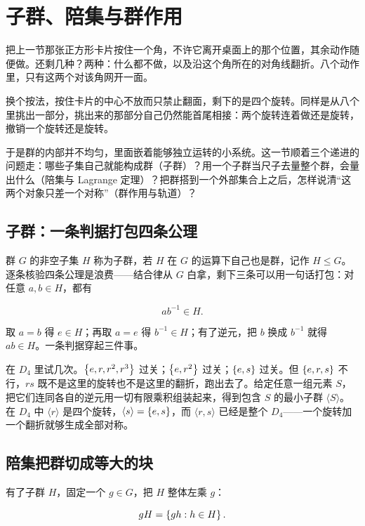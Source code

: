 \section{子群、陪集与群作用}
\label{sec:04-Discrete-Mathematics/06-Groups-and-Symmetry/02}

把上一节那张正方形卡片按住一个角，不许它离开桌面上的那个位置，其余动作随便做。还剩几种？两种：什么都不做，以及沿这个角所在的对角线翻折。八个动作里，只有这两个对该角网开一面。

换个按法，按住卡片的中心不放而只禁止翻面，剩下的是四个旋转。同样是从八个里挑出一部分，挑出来的那部分自己仍然能首尾相接：两个旋转连着做还是旋转，撤销一个旋转还是旋转。

于是群的内部并不均匀，里面嵌着能够独立运转的小系统。这一节顺着三个递进的问题走：哪些子集自己就能构成群（子群）？用一个子群当尺子去量整个群，会量出什么（陪集与 Lagrange 定理）？把群搭到一个外部集合上之后，怎样说清``这两个对象只差一个对称''（群作用与轨道）？

\subsection{子群：一条判据打包四条公理}

群 \(G\) 的非空子集 \(H\) 称为子群，若 \(H\) 在 \(G\) 的运算下自己也是群，记作 \(H\le G\)。逐条核验四条公理是浪费——结合律从 \(G\) 白拿，剩下三条可以用一句话打包：对任意 \(a,b\in H\)，都有

\[
ab^{-1}\in H.
\]

取 \(a=b\) 得 \(e\in H\)；再取 \(a=e\) 得 \(b^{-1}\in H\)；有了逆元，把 \(b\) 换成 \(b^{-1}\) 就得 \(ab\in H\)。一条判据穿起三件事。

在 \(D_4\) 里试几次。\(\left\{e,r,r^2,r^3\right\}\) 过关；\(\left\{e,r^2\right\}\) 过关；\(\left\{e,s\right\}\) 过关。但 \(\left\{e,r,s\right\}\) 不行，\(rs\) 既不是这里的旋转也不是这里的翻折，跑出去了。给定任意一组元素 \(S\)，把它们连同各自的逆元用一切有限乘积组装起来，得到包含 \(S\) 的最小子群 \(\langle S\rangle\)。在 \(D_4\) 中 \(\langle r\rangle\) 是四个旋转，\(\langle s\rangle=\left\{e,s\right\}\)，而 \(\langle r,s\rangle\) 已经是整个 \(D_4\)——一个旋转加一个翻折就够生成全部对称。

\subsection{陪集把群切成等大的块}

有了子群 \(H\)，固定一个 \(g\in G\)，把 \(H\) 整体左乘 \(g\)：

\[
gH=\left\{gh:h\in H\right\}.
\]

